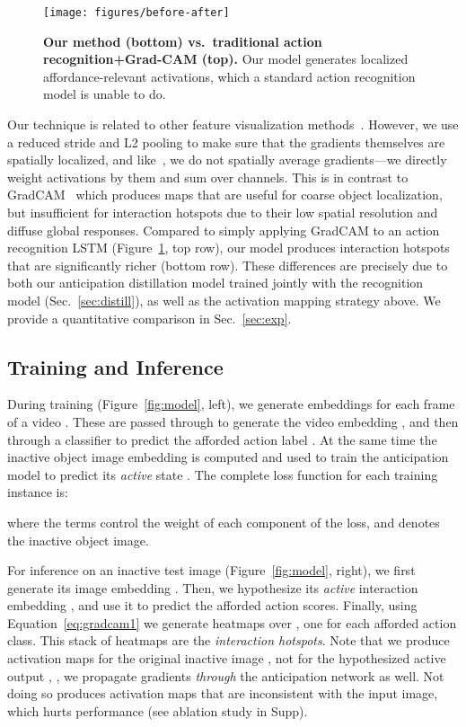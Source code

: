 \documentclass[10pt,twocolumn,letterpaper]{article}
\newcommand{\refeqn}[1]{Equation~\ref{#1}}
\newcommand{\reffig}[1]{Figure~\ref{#1}}
\begin{document}
\begin{figure}[t!]
\centering
\texttt{[image: figures/before-after]}\vspace*{-0.1in}
\caption{\textbf{Our method (bottom) vs.~traditional action recognition+Grad-CAM (top).} Our model generates localized affordance-relevant activations, which a standard action recognition model is unable to do. }
\label{fig:before-after}
\end{figure}

Our technique is related to other feature visualization methods~\cite{springenberg2015striving,zhou2016learning,selvaraju2017grad}. However, we use a reduced stride and L2 pooling to make sure that the gradients themselves are spatially localized, and like~\cite{springenberg2015striving}, we do not spatially average gradients---we directly weight activations by them and sum over channels. This is in contrast to GradCAM~\cite{zhou2016learning,selvaraju2017grad} which produces maps that are useful for coarse object localization, but insufficient for interaction hotspots due to their low spatial resolution and diffuse global responses.  Compared to simply applying GradCAM to an action recognition LSTM (\reffig{fig:before-after}, top row), our model produces interaction hotspots that are significantly richer (bottom row). These differences are precisely due to both our anticipation distillation model trained jointly with the recognition model (Sec.~\ref{sec:distill}), as well as the activation mapping strategy above. We provide a quantitative comparison in Sec.~\ref{sec:exp}.

\subsection{Training and Inference} \label{sec:inference}

During training (\reffig{fig:model}, left), we generate embeddings  for each frame of a video . These are passed through  to generate the video embedding , and then through a classifier to predict the afforded action label . At the same time the inactive object image embedding  is computed and used to train the anticipation model to predict its \emph{active} state . 
The complete loss function for each training instance is:

where the  terms control the weight of each component of the loss, and  denotes the inactive object image.


For inference on an inactive test image (\reffig{fig:model}, right), we first generate its image embedding . Then, we hypothesize its \emph{active} interaction embedding , and use it to predict the afforded action scores.
Finally, using \refeqn{eq:gradcam1} we generate  heatmaps over , one for each afforded action class. This stack of heatmaps are the \emph{interaction hotspots}.
Note that we produce activation maps for the original inactive image , not for the hypothesized active output , \ie, we propagate gradients \emph{through} the anticipation network as well. Not doing so produces activation maps that are inconsistent with the input image, which hurts performance (see ablation study in Supp).
\end{document}
